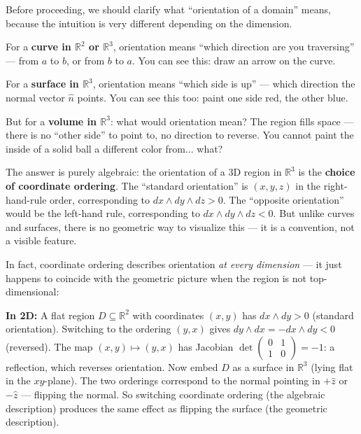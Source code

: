 \documentclass[11pt]{report}
\newcommand{\R}{\mathbb{R}}
\begin{document}
Before proceeding, we should clarify what ``orientation of a domain'' means, because the intuition is very different depending on the dimension.

For a \textbf{curve in $\R^2$ or $\R^3$}, orientation means ``which direction are you traversing'' --- from $a$ to $b$, or from $b$ to $a$. You can see this: draw an arrow on the curve.

For a \textbf{surface in $\R^3$}, orientation means ``which side is up'' --- which direction the normal vector $\hat{n}$ points. You can see this too: paint one side red, the other blue.

But for a \textbf{volume in $\R^3$}: what would orientation mean? The region fills space --- there is no ``other side'' to point to, no direction to reverse. You cannot paint the inside of a solid ball a different color from... what?

The answer is purely algebraic: the orientation of a 3D region in $\R^3$ is the \textbf{choice of coordinate ordering}. The ``standard orientation'' is $(x, y, z)$ in the right-hand-rule order, corresponding to $dx \wedge dy \wedge dz > 0$. The ``opposite orientation'' would be the left-hand rule, corresponding to $dx \wedge dy \wedge dz < 0$. But unlike curves and surfaces, there is no geometric way to visualize this --- it is a convention, not a visible feature.

In fact, coordinate ordering describes orientation \textit{at every dimension} --- it just happens to coincide with the geometric picture when the region is not top-dimensional:

\textbf{In 2D:} A flat region $D \subseteq \R^2$ with coordinates $(x,y)$ has $dx \wedge dy > 0$ (standard orientation). Switching to the ordering $(y,x)$ gives $dy \wedge dx = -dx \wedge dy < 0$ (reversed). The map $(x,y) \mapsto (y,x)$ has Jacobian $\det\left(\begin{smallmatrix} 0 & 1 \\ 1 & 0 \end{smallmatrix}\right) = -1$: a reflection, which reverses orientation. Now embed $D$ as a surface in $\R^3$ (lying flat in the $xy$-plane). The two orderings correspond to the normal pointing in $+\hat{z}$ or $-\hat{z}$ --- flipping the normal. So switching coordinate ordering (the algebraic description) produces the same effect as flipping the surface (the geometric description).
\end{document}
